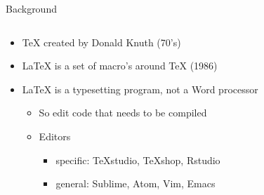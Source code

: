 \documentclass[ignorenonframetext]{beamer}
\begin{document}
\begin{frame}[fragile]{Background}

  \begin{columns}
    \begin{column}{.5\textwidth}
      \begin{itemize}
        \item \TeX{} created by Donald Knuth (70's)
        \item \LaTeX{} is a set of macro's around TeX (1986)
        \item \LaTeX{} is a \alert{typesetting program}, not a \alert{Word
          processor}
          \begin{itemize}
            \item So \alert{edit} code that needs to be compiled
          \end{itemize}
          \begin{itemize}
            \item Editors
              \begin{itemize}
                \item specific: TeXstudio, TeXshop, Rstudio
                \item general: Sublime, Atom, Vim, Emacs
              \end{itemize}
          \end{itemize}
        \end{itemize}
    \end{column}


\end{columns}
\end{frame}
\end{document}
